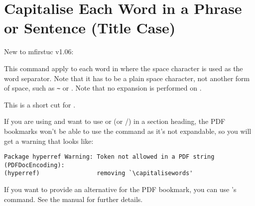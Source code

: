 \documentclass{nlctdoc}
\begin{document}
\section{Capitalise Each Word in a Phrase or Sentence (Title Case)}
\label{sec:capitalisewords}

New to mfirstuc v1.06:
\begin{definition}[\DescribeMacro{\capitalisewords}]
\end{definition}
This command apply  to each word in 
where the space character is used as the word separator. Note that
it has to be a plain space character, not another form of space,
such as \verb|~| or . Note that no expansion is performed
on .

\begin{definition}[\DescribeMacro{\xcapitalisewords}]
\end{definition}
This is a short cut for
.

\begin{important}
If you are using  and want to use 
or  (or \slash{}) 
in a section heading, the PDF bookmarks won't be able to use the command 
as it's not expandable, so you will get a warning that looks like:
\begin{verbatim}
Package hyperref Warning: Token not allowed in a PDF string 
(PDFDocEncoding):
(hyperref)                removing `\capitalisewords'
\end{verbatim}
If you want to provide an alternative for the PDF bookmark, you can
use 's  command. See the
 manual for further details.
\end{important}
\end{document}
